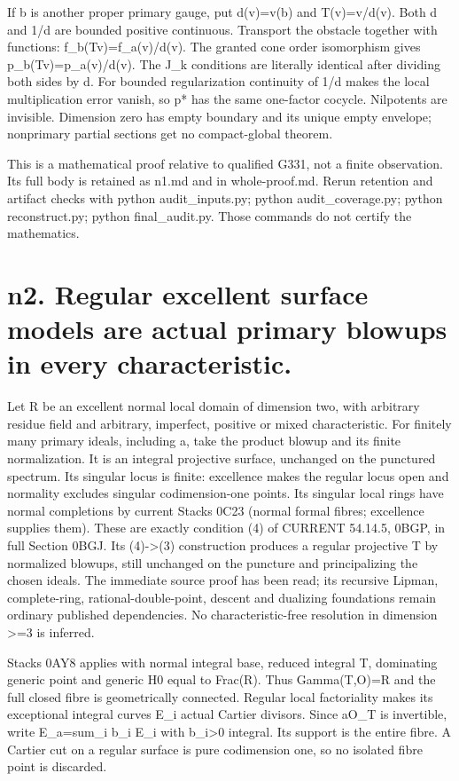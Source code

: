 \documentclass[11pt]{article}
\begin{document}
If b is another proper primary gauge, put d(v)=v(b) and T(v)=v/d(v). Both d and 1/d are bounded positive continuous. Transport the obstacle together with functions: f\_b(Tv)=f\_a(v)/d(v). The granted cone order isomorphism gives p\_b(Tv)=p\_a(v)/d(v). The J\_k conditions are literally identical after dividing both sides by d. For bounded regularization continuity of 1/d makes the local multiplication error vanish, so p* has the same one-factor cocycle. Nilpotents are invisible. Dimension zero has empty boundary and its unique empty envelope; nonprimary partial sections get no compact-global theorem.

This is a mathematical proof relative to qualified G331, not a finite observation. Its full body is retained as n1.md and in whole-proof.md. Rerun retention and artifact checks with python audit\_inputs.py; python audit\_coverage.py; python reconstruct.py; python final\_audit.py. Those commands do not certify the mathematics.

\section*{n2. Regular excellent surface models are actual primary blowups in every characteristic.}
Let R be an excellent normal local domain of dimension two, with arbitrary residue field and arbitrary, imperfect, positive or mixed characteristic. For finitely many primary ideals, including a, take the product blowup and its finite normalization. It is an integral projective surface, unchanged on the punctured spectrum. Its singular locus is finite: excellence makes the regular locus open and normality excludes singular codimension-one points. Its singular local rings have normal completions by current Stacks 0C23 (normal formal fibres; excellence supplies them). These are exactly condition (4) of CURRENT 54.14.5, 0BGP, in full Section 0BGJ. Its (4)->(3) construction produces a regular projective T by normalized blowups, still unchanged on the puncture and principalizing the chosen ideals. The immediate source proof has been read; its recursive Lipman, complete-ring, rational-double-point, descent and dualizing foundations remain ordinary published dependencies. No characteristic-free resolution in dimension >=3 is inferred.

Stacks 0AY8 applies with normal integral base, reduced integral T, dominating generic point and generic H0 equal to Frac(R). Thus Gamma(T,O)=R and the full closed fibre is geometrically connected. Regular local factoriality makes its exceptional integral curves E\_i actual Cartier divisors. Since aO\_T is invertible, write E\_a=sum\_i b\_i E\_i with b\_i>0 integral. Its support is the entire fibre. A Cartier cut on a regular surface is pure codimension one, so no isolated fibre point is discarded.
\end{document}
